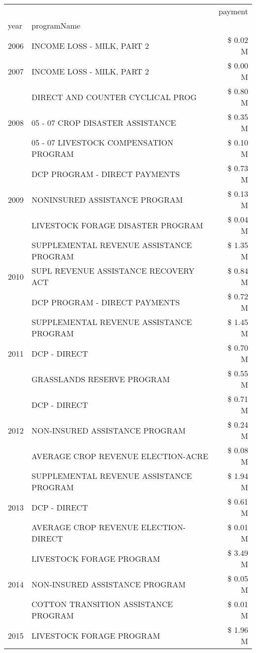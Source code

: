 \begin{tabular}{llr}
\toprule
 &  & payment \\
year & programName &  \\
\midrule
2006 & INCOME LOSS - MILK, PART 2 & \$ 0.02 M \\
\cline{1-3}
2007 & INCOME LOSS - MILK, PART 2 & \$ 0.00 M \\
\cline{1-3}
\multirow[t]{3}{*}{2008} & DIRECT AND COUNTER CYCLICAL PROG & \$ 0.80 M \\
 & 05 - 07 CROP DISASTER ASSISTANCE & \$ 0.35 M \\
 & 05 - 07 LIVESTOCK COMPENSATION PROGRAM & \$ 0.10 M \\
\cline{1-3}
\multirow[t]{3}{*}{2009} & DCP PROGRAM - DIRECT PAYMENTS & \$ 0.73 M \\
 & NONINSURED ASSISTANCE PROGRAM & \$ 0.13 M \\
 & LIVESTOCK FORAGE DISASTER  PROGRAM & \$ 0.04 M \\
\cline{1-3}
\multirow[t]{3}{*}{2010} & SUPPLEMENTAL REVENUE ASSISTANCE PROGRAM & \$ 1.35 M \\
 & SUPL REVENUE ASSISTANCE RECOVERY ACT & \$ 0.84 M \\
 & DCP PROGRAM - DIRECT PAYMENTS & \$ 0.72 M \\
\cline{1-3}
\multirow[t]{3}{*}{2011} & SUPPLEMENTAL REVENUE ASSISTANCE PROGRAM & \$ 1.45 M \\
 & DCP - DIRECT & \$ 0.70 M \\
 & GRASSLANDS RESERVE PROGRAM & \$ 0.55 M \\
\cline{1-3}
\multirow[t]{3}{*}{2012} & DCP - DIRECT & \$ 0.71 M \\
 & NON-INSURED ASSISTANCE PROGRAM & \$ 0.24 M \\
 & AVERAGE CROP REVENUE ELECTION-ACRE & \$ 0.08 M \\
\cline{1-3}
\multirow[t]{3}{*}{2013} & SUPPLEMENTAL REVENUE ASSISTANCE PROGRAM & \$ 1.94 M \\
 & DCP - DIRECT & \$ 0.61 M \\
 & AVERAGE CROP REVENUE ELECTION-DIRECT & \$ 0.01 M \\
\cline{1-3}
\multirow[t]{3}{*}{2014} & LIVESTOCK FORAGE PROGRAM & \$ 3.49 M \\
 & NON-INSURED ASSISTANCE PROGRAM & \$ 0.05 M \\
 & COTTON TRANSITION ASSISTANCE PROGRAM & \$ 0.01 M \\
\cline{1-3}
\multirow[t]{3}{*}{2015} & LIVESTOCK FORAGE PROGRAM & \$ 1.96 M \\

\end{tabular}
